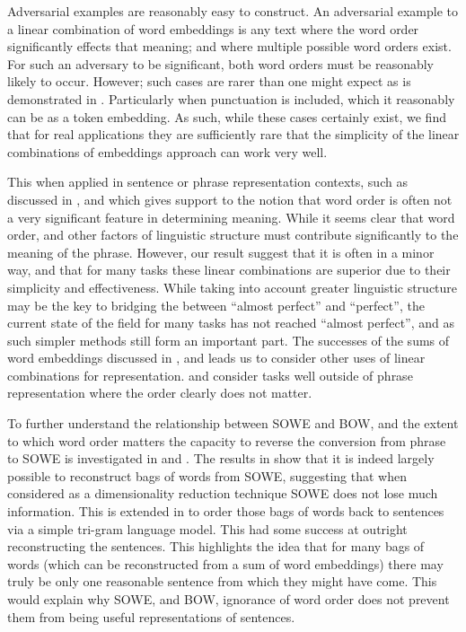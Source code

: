 \documentclass{book}
\begin{document}
Adversarial examples are reasonably easy to construct.
An adversarial example to a linear combination of word embeddings is any text where the word order significantly effects that meaning;
and where multiple possible word orders exist.
For such an adversary to be significant, both word orders must be reasonably likely to occur.
However; such cases are rarer than one might expect  as is demonstrated in .
Particularly when punctuation is included, which it reasonably can be as a token embedding.
As such, while these cases certainly exist, we find that for real applications
they are sufficiently rare that the simplicity of the linear combinations of embeddings approach can work very well.


This when applied in sentence or phrase representation contexts,
such as discussed in , and 
which gives support to the notion that word order is often not a very significant feature in determining meaning.
While it seems clear that word order, and other factors of linguistic structure must contribute significantly to the meaning of the phrase.
However, our result suggest that it is often in a minor way, and that for many tasks these linear combinations are superior due to their simplicity and effectiveness.
While taking into account greater linguistic structure may be the key to bridging the between ``almost perfect'' and ``perfect'', the current state of the field for many tasks has not reached ``almost perfect'', and as such simpler methods still form an important part.
The successes of the sums of word embeddings discussed in , and  leads us to consider other uses of linear combinations for representation.
 and  consider tasks well outside of phrase representation where the order clearly does not matter.

To further understand the relationship between SOWE and BOW, and the extent to which word order matters the capacity to reverse the conversion from phrase to SOWE is investigated in  and .
The results in  show that it is indeed largely possible to reconstruct bags of words from SOWE, suggesting that when considered as a dimensionality reduction technique SOWE does not lose much information.
This is extended in  to order those bags of words back to sentences via a simple tri-gram language model.
This had some success at outright reconstructing the sentences.
This highlights the idea that for many  bags of words (which can be reconstructed from a sum of word embeddings) there may truly be only one reasonable sentence from which they might have come.
This would explain why SOWE, and BOW, ignorance of word order does not prevent them from being useful representations of sentences.
\end{document}

